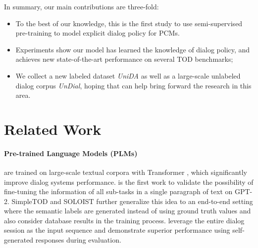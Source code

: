 \documentclass[letterpaper]{article} \usepackage{aaai22}  \usepackage{times}  \usepackage{helvet}  \usepackage{courier}  \usepackage[hyphens]{url}  \usepackage{graphicx} \urlstyle{rm} \def\UrlFont{\rm}  \usepackage{natbib}  \usepackage{caption} \DeclareCaptionStyle{ruled}{labelfont=normalfont,labelsep=colon,strut=off} \frenchspacing  \setlength{\pdfpagewidth}{8.5in}  \setlength{\pdfpageheight}{11in}  \usepackage{algorithm}
\begin{document}
In summary, our main contributions are three-fold:
\begin{itemize}
    \item To the best of our knowledge,
this is the first study to use semi-supervised pre-training to model explicit dialog policy for PCMs.
     \item Experiments show our model has learned the knowledge of dialog policy, and achieves new state-of-the-art performance on several TOD benchmarks;
     \item We collect a new labeled 
dataset \textit{UniDA} as well as a large-scale unlabeled dialog corpus \textit{UnDial}, hoping that can help bring forward the research in this area.
\end{itemize}


















































\section{Related Work}


\paragraph{Pre-trained Language Models (PLMs)} are trained on large-scale textual corpora with Transformer \cite{devlin2018bert, gpt2}, which significantly improve dialog systems performance.
\citet{budzianowski2019hello} is the first work to validate the possibility of fine-tuning the information of all sub-tasks in a single paragraph of text on GPT-2.
SimpleTOD \cite{hosseini2020simple}  and SOLOIST \cite{peng2020soloist} further generalize this idea to an end-to-end setting where the semantic labels are generated instead of using ground truth values and also consider database results in the training process.
\citet{yang2020ubar} leverage the entire dialog session as the input sequence and demonstrate superior performance using self-generated responses during evaluation.
\end{document}

